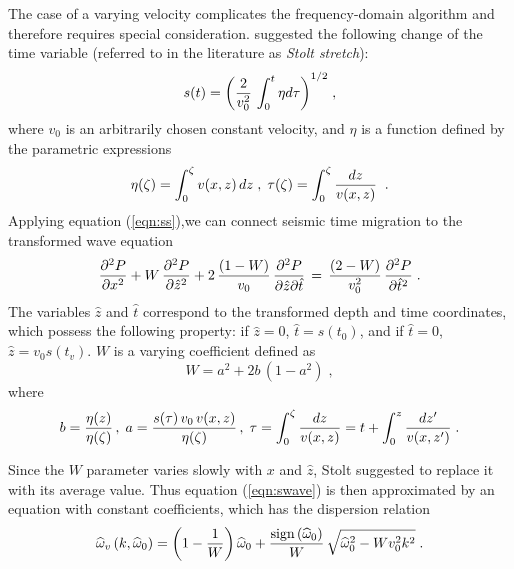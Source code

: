 The case of a varying velocity complicates the frequency-domain
algorithm and therefore requires special consideration.
\cite{GEO43-01-00230048} suggested the following change of the
time variable (referred to in the literature as {\em Stolt stretch}):
\begin{equation}
s(t)={\left({{2 \over v_0^2}\,\int_0^t\eta d \tau}\right)}^{1/2}\;,
\label{eqn:ss} 
\end{equation}
where $v_0$ is an arbitrarily chosen constant velocity, and $\eta$ is a
function defined by the parametric expressions
\begin{equation}
\eta(\zeta)=\int_0^{\zeta} v(x,z) \,dz \;,\;
\tau(\zeta)=\int_0^{\zeta} { {dz} \over {v(x,z)}}\;\;.
\end{equation} 
Applying equation (\ref{eqn:ss}),we can connect seismic time migration
to the transformed wave equation
\begin{equation}
{\partial^2 P \over \partial x^2} +
W\,{\partial^2 P \over \partial \hat{z}^2} + 2\, {{(1-W)} \over v_0}\,
{{\partial^2 P} \over {\partial \hat{z} \partial \hat{t}}}  \, = 
\,{(2-W) \over v_0^2 }\,
{\partial^2 P \over \partial \hat{t}^2}\;. 
\label{eqn:swave} 
\end{equation}
The variables $\hat{z}$ and $\hat{t}$ correspond to the transformed
depth and time coordinates, which possess the following property: if
$\hat{z}=0$, $\hat{t}=s\left(t_0\right)$, and if $\hat{t}=0$,
$\hat{z}=v_0 s\left(t_v\right)$. $W$ is a varying coefficient defined
as
\begin{equation}
W=a^2+2b\,(1-a^2)\;,
\label{eqn:wstolt} 
\end{equation}
where 
\begin{eqnarray*}
b={{\eta(z)}\over{\eta(\zeta)}}\,,\;
a={{s(\tau)\,v_0\,v(x,z)}\over{\eta(\zeta)}}\,,\;
\tau=\int_0^\zeta{{dz}\over{v(x,z)}}=t+ \int_0^z{{dz'}\over{v(x,z')}}\;.
\end{eqnarray*}

Since the $W$ parameter varies slowly with $x$ and $\hat{z}$, Stolt
suggested to replace it with its average value.  Thus equation
(\ref{eqn:swave}) is then approximated by an equation with constant
coefficients, which has the dispersion relation
\begin{equation}
\widehat{\omega}_v\left(k,\widehat{\omega}_0 \right)=
\left(1-{1\over W}\right) \widehat{\omega}_0+
{{\mbox{sign}\left(\widehat{\omega}_0\right)}\over W}\,
\sqrt{\widehat{\omega}_0^2 - W v_0^2 k^2}\;.
\label{eqn:sdispersion} 
\end{equation}


